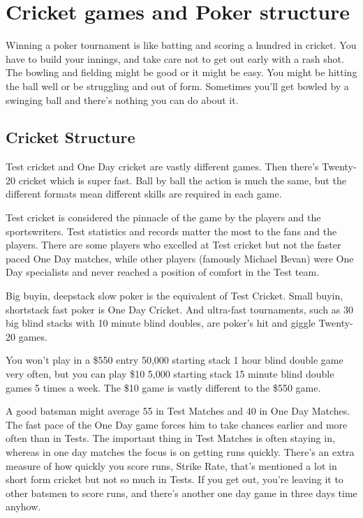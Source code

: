 \chapter{Cricket games and Poker structure}


Winning a poker tournament is like batting and scoring a hundred in cricket.
You have to build your innings, and take care not to get out early
with a rash shot. The bowling and fielding might be good or it might
be easy. You might be hitting the ball well or be struggling and out
of form. Sometimes you'll get bowled by a swinging ball and
there's nothing you can do about it.

\section{Cricket Structure}

Test cricket and One Day cricket are vastly different games. Then
there's Twenty-20 cricket which is super fast. Ball by ball the
action is much the same, but the different formats mean
different skills are required in each game.

Test cricket is considered the pinnacle of the game by the players
and the sportswriters. Test statistics and records
matter the most to the fans and the players. There are some players who excelled
at Test cricket but not the faster paced One Day matches, while
other players (famously Michael Bevan) were One Day
specialists and never reached a position of comfort in the Test team.

Big buyin, deepstack slow poker is the equivalent of Test Cricket.
Small buyin, shortstack fast poker is One Day Cricket.
And ultra-fast tournaments, such as 30 big blind stacks with 10 minute
blind doubles, are poker's hit and giggle Twenty-20 games.

You won't play in a \$550 entry 50,000 starting stack 1 hour blind double
game very often, but you can play \$10 5,000 starting stack 15 minute
blind double games 5 times a week. The \$10 game is vastly
different to the \$550 game.

A good batsman might average 55 in Test Matches and 40 in One Day
Matches. The fast pace of the One Day game forces him to take
chances earlier and more often than in Tests. The important thing in
Test Matches is often staying in, whereas in one day matches
the focus is on getting runs quickly. There's an extra
measure of how quickly you score runs, Strike Rate, that's mentioned
a lot in short form cricket but not so much in Tests. If you get out,
you're leaving it to other batsmen to score runs, and there's another
one day game in three days time anyhow.

